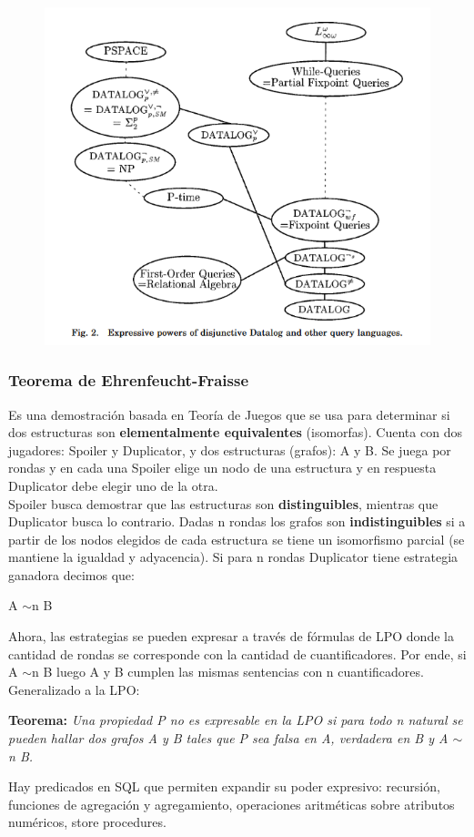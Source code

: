 \begin{figure}[H]
    \centering
    \includegraphics[scale=0.7]{fig/poder-expresivo.png}
\end{figure}

\subsubsection*{Teorema de Ehrenfeucht-Fraisse}
Es una demostración basada en Teoría de Juegos que se usa para determinar si dos estructuras son \textbf{elementalmente equivalentes} (isomorfas). Cuenta con dos jugadores: Spoiler y Duplicator, y dos estructuras (grafos): A y B. Se juega por rondas y en cada una Spoiler elige un nodo de una estructura y en respuesta Duplicator debe elegir uno de la otra. \\
Spoiler busca demostrar que las estructuras son \textbf{distinguibles}, mientras que Duplicator busca lo contrario. Dadas n rondas los grafos son \textbf{indistinguibles} si a partir de los nodos elegidos de cada estructura se tiene un isomorfismo parcial (se mantiene la igualdad y adyacencia). Si para n rondas Duplicator tiene estrategia ganadora decimos que:
\begin{center}
    A $\sim$n B
\end{center}
Ahora, las estrategias se pueden expresar a través de fórmulas de LPO donde la cantidad de rondas se corresponde con la cantidad de cuantificadores. Por ende, si A $\sim$n B luego A y B cumplen las mismas sentencias con n cuantificadores. Generalizado a la LPO:

\textbf{Teorema:} \textit{Una propiedad P no es expresable en la LPO si para todo n natural se pueden hallar dos grafos A y B tales que P sea falsa en A, verdadera en B y A $\sim$n B.}

Hay predicados  en SQL que permiten expandir su poder expresivo: recursión, funciones de agregación y agregamiento, operaciones aritméticas sobre atributos numéricos, store procedures.
